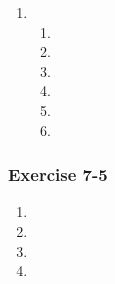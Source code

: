 \begin{multicols}{3}
\begin{enumerate}[noitemsep, label=\textbf{\arabic*}. ]
\item %
    \begin{enumerate}[noitemsep, label=\textbf{(\alph*)} ]
       \item 
\item
\item
\item
\item
\item
      \end{enumerate}
\end{enumerate}
\subsubsection*{Exercise 7-5} %
\begin{enumerate}[noitemsep, label=\textbf{\arabic*}. ] 

\item %
\item %
\item %
\item %

\end{enumerate}

    


\end{multicols}
